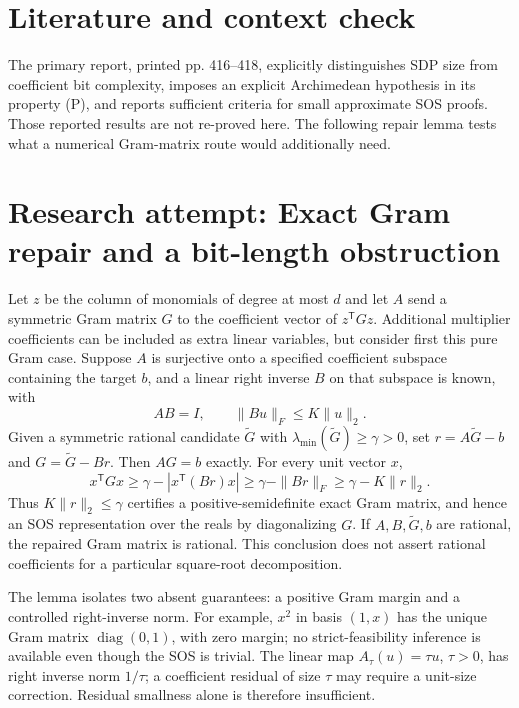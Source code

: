 \documentclass[11pt]{article}
\begin{document}
\section{Literature and context check}
The primary report, printed pp. 416--418, explicitly distinguishes SDP size from coefficient bit complexity, imposes an explicit Archimedean hypothesis in its property (P), and reports sufficient criteria for small approximate SOS proofs. Those reported results are not re-proved here. The following repair lemma tests what a numerical Gram-matrix route would additionally need.
\section{Research attempt: Exact Gram repair and a bit-length obstruction}

Let $z$ be the column of monomials of degree at most $d$ and let $A$ send a symmetric Gram matrix $G$ to the coefficient vector of $z^{\mathsf T}Gz$. Additional multiplier coefficients can be included as extra linear variables, but consider first this pure Gram case. Suppose $A$ is surjective onto a specified coefficient subspace containing the target $b$, and a linear right inverse $B$ on that subspace is known, with
\[
AB=I,\qquad \|Bu\|_F\leq K\|u\|_2.
\]
Given a symmetric rational candidate $\widetilde G$ with $\lambda_{\min}(\widetilde G)\geq\gamma>0$, set $r=A\widetilde G-b$ and $G=\widetilde G-Br$. Then $AG=b$ exactly. For every unit vector $x$,
\[
x^{\mathsf T}Gx\geq\gamma-|x^{\mathsf T}(Br)x|
\geq\gamma-\|Br\|_F\geq\gamma-K\|r\|_2.
\]
Thus $K\|r\|_2\leq\gamma$ certifies a positive-semidefinite exact Gram matrix, and hence an SOS representation over the reals by diagonalizing $G$. If $A,B,\widetilde G,b$ are rational, the repaired Gram matrix is rational. This conclusion does not assert rational coefficients for a particular square-root decomposition.

The lemma isolates two absent guarantees: a positive Gram margin and a controlled right-inverse norm. For example, $x^2$ in basis $(1,x)$ has the unique Gram matrix $\operatorname{diag}(0,1)$, with zero margin; no strict-feasibility inference is available even though the SOS is trivial. The linear map $A_\tau(u)=\tau u$, $\tau>0$, has right inverse norm $1/\tau$; a coefficient residual of size $\tau$ may require a unit-size correction. Residual smallness alone is therefore insufficient.
\end{document}
